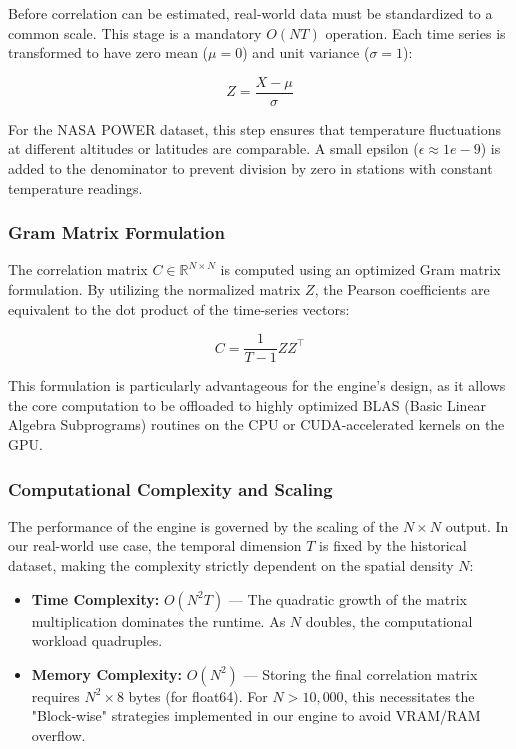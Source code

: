 Before correlation can be estimated, real-world data must be standardized to a common scale. This stage is a mandatory $O(NT)$ operation. Each time series is transformed to have zero mean ($\mu = 0$) and unit variance ($\sigma = 1$):

\begin{equation}
Z = \frac{X - \mu}{\sigma}
\label{eq:standardization}
\end{equation}

For the NASA POWER dataset, this step ensures that temperature fluctuations at different altitudes or latitudes are comparable. A small epsilon ($\epsilon \approx 1e-9$) is added to the denominator to prevent division by zero in stations with constant temperature readings.

\subsubsection{Gram Matrix Formulation}

The correlation matrix $C \in \mathbb{R}^{N \times N}$ is computed using an optimized Gram matrix formulation. By utilizing the normalized matrix $Z$, the Pearson coefficients are equivalent to the dot product of the time-series vectors:

\begin{equation}
C = \frac{1}{T-1} Z Z^\top
\label{eq:correlation}
\end{equation}

This formulation is particularly advantageous for the engine's design, as it allows the core computation to be offloaded to highly optimized BLAS (Basic Linear Algebra Subprograms) routines on the CPU or CUDA-accelerated kernels on the GPU.

\subsubsection{Computational Complexity and Scaling}

The performance of the engine is governed by the scaling of the $N \times N$ output. In our real-world use case, the temporal dimension $T$ is fixed by the historical dataset, making the complexity strictly dependent on the spatial density $N$:

\begin{itemize}
    \item \textbf{Time Complexity:} $O(N^2 T)$ — The quadratic growth of the matrix multiplication dominates the runtime. As $N$ doubles, the computational workload quadruples.
    \item \textbf{Memory Complexity:} $O(N^2)$ — Storing the final correlation matrix requires $N^2 \times 8$ bytes (for float64). For $N > 10,000$, this necessitates the "Block-wise" strategies implemented in our engine to avoid VRAM/RAM overflow.
\end{itemize}

